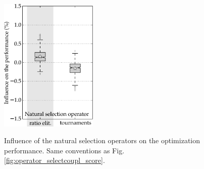 \documentclass{ametsoc}
\begin{document}
\begin{figure}[t]
	\begin{center}
		\noindent\includegraphics[width=11pc,angle=0]{fig12.pdf}\\
	\end{center}
	\caption{Influence of the natural selection operators on the optimization performance. Same conventions as Fig. \ref{fig:operator_selectcoupl_score}.}
	\label{fig:operator_selectnat_score}
\end{figure}
\end{document}
